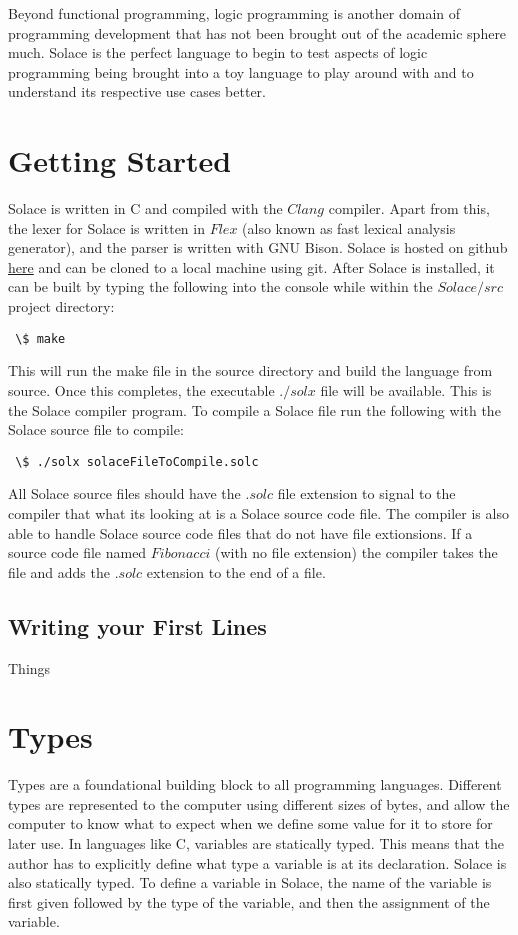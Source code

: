 \documentclass{article}
\begin{document}
Beyond functional programming, logic programming is another domain of programming development that has not been brought out
of the academic sphere much. Solace is the perfect language to begin to test aspects of logic programming being brought into a
toy language to play around with and to understand its respective use cases better.


\section{Getting Started}
Solace is written in C and compiled with the $Clang$ compiler. Apart from this, the lexer for Solace is written in $Flex$
(also known as fast lexical analysis generator), and the parser is written with GNU Bison. Solace is hosted on github
\href{https://github.com/JustSomeCarbon/Solace/tree/main}{here} and can be cloned to a local machine using git. After
Solace is installed, it can be built by typing the following into the console while within the $Solace/src$ project directory:

\begin{lstlisting}
 \$ make
\end{lstlisting}

This will run the make file in the source directory and build the language from source. Once this completes, the executable
$./solx$ file will be available. This is the Solace compiler program. To compile a Solace file run the following with the
Solace source file to compile:

\begin{lstlisting}
 \$ ./solx solaceFileToCompile.solc
\end{lstlisting}

All Solace source files should have the $.solc$ file extension to signal to the compiler that what its looking at is a
Solace source code file. The compiler is also able to handle Solace source code files that do not have file extionsions.
If a source code file named $Fibonacci$ (with no file extension) the compiler takes the file and adds the $.solc$ extension
to the end of a file.

\subsection{Writing your First Lines}
Things


\section{Types}
Types are a foundational building block to all programming languages. Different types are represented to the computer using
different sizes of bytes, and allow the computer to know what to expect when we define some value for it to store for later
use. In languages like C, variables are statically typed. This means that the author has to explicitly define what type a
variable is at its declaration. Solace is also statically typed. To define a variable in Solace, the name of the variable is
first given followed by the type of the variable, and then the assignment of the variable.
\end{document}
